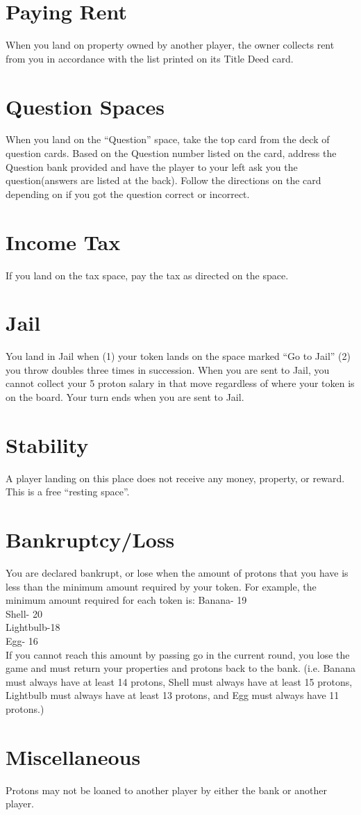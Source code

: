 \documentclass{article}
\begin{document}
\section{Paying Rent}
When you land on property owned by another player, the owner collects rent from you in accordance with the list printed on its Title Deed card. 

\section{Question Spaces}
When you land on the “Question” space, take the top card from the deck of question cards. Based on the Question number listed on the card, address the Question bank provided and have the player to your left ask you the question(answers are listed at the back). Follow the directions on the card depending on if you got the question correct or incorrect. 

\section{Income Tax}
If you land on the tax space, pay the tax as directed on the space. 

\section{Jail}
You land in Jail when (1) your token lands on the space marked “Go to Jail” (2) you throw doubles three times in succession. When you are sent to Jail, you cannot collect your 5 proton salary in that move regardless of where your token is on the board. Your turn ends when you are sent to Jail. 

\section{Stability}
A player landing on this place does not receive any money, property, or reward. This is a free “resting space”. 

\section{Bankruptcy/Loss}
You are declared bankrupt, or lose when the amount of protons that you have is less than the minimum amount required by your token. For example, the minimum amount required for each token is: 
Banana- 19\\
Shell- 20\\
Lightbulb-18\\
Egg- 16\\
If you cannot reach this amount by passing go in the current round, you lose the game and must return your properties and protons back to the bank. (i.e. Banana must always have at least 14 protons, Shell must always have at least 15 protons, Lightbulb must always have at least 13 protons, and Egg must always have 11 protons.)

\section{Miscellaneous}
Protons may not be loaned to another player by either the bank or another player. 
\end{document}
